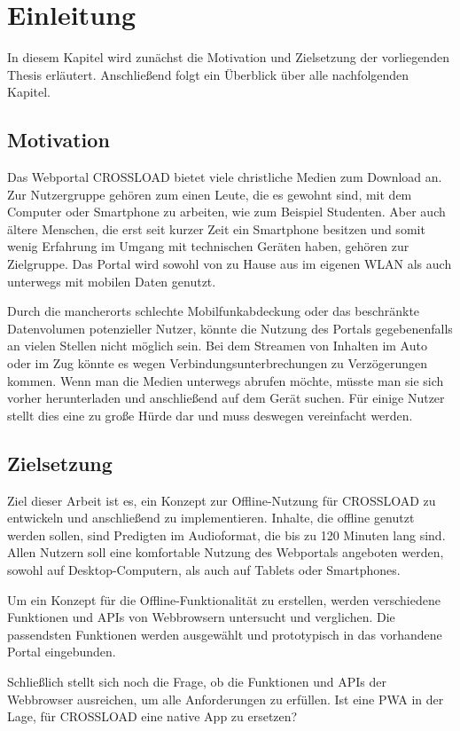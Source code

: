\chapter{Einleitung}
\label{Kap1}
In diesem Kapitel wird zunächst die Motivation und Zielsetzung der vorliegenden Thesis erläutert. Anschließend folgt ein Überblick über alle nachfolgenden Kapitel.

\section{Motivation}
Das Webportal CROSSLOAD bietet viele christliche Medien zum Download an. Zur Nutzergruppe gehören zum einen Leute, die es gewohnt sind, mit dem Computer oder Smartphone zu arbeiten, wie zum Beispiel Studenten. Aber auch ältere Menschen, die erst seit kurzer Zeit ein Smartphone besitzen und somit wenig Erfahrung im Umgang mit technischen Geräten haben, gehören zur Zielgruppe. Das Portal wird sowohl von zu Hause aus im eigenen WLAN als auch unterwegs mit mobilen Daten genutzt.

Durch die mancherorts schlechte Mobilfunkabdeckung oder das beschränkte Datenvolumen potenzieller Nutzer, könnte die Nutzung des Portals gegebenenfalls an vielen Stellen nicht möglich sein. Bei dem Streamen von Inhalten im Auto oder im Zug könnte es wegen Verbindungsunterbrechungen zu Verzögerungen kommen. Wenn man die Medien unterwegs abrufen möchte, müsste man sie sich vorher herunterladen und anschließend auf dem Gerät suchen. Für einige Nutzer stellt dies eine zu große Hürde dar und muss deswegen vereinfacht werden. 

\section{Zielsetzung}
Ziel dieser Arbeit ist es, ein Konzept zur Offline-Nutzung für CROSSLOAD zu entwickeln und anschließend zu implementieren. Inhalte, die offline genutzt werden sollen, sind Predigten im Audioformat, die bis zu 120 Minuten lang sind. Allen Nutzern soll eine komfortable Nutzung des Webportals angeboten werden, sowohl auf Desktop-Computern, als auch auf Tablets oder Smartphones. 

Um ein Konzept für die Offline-Funktionalität zu erstellen, werden verschiedene Funktionen und \acp{API} von Webbrowsern untersucht und verglichen. Die passendsten Funktionen werden ausgewählt und prototypisch in das vorhandene Portal eingebunden.

Schließlich stellt sich noch die Frage, ob die Funktionen und APIs der Webbrowser ausreichen, um alle Anforderungen zu erfüllen. Ist eine \ac{PWA} in der Lage, für CROSSLOAD eine native App zu ersetzen?

